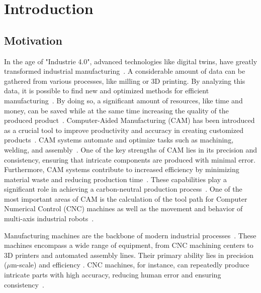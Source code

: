 \chapter{Introduction}%
\section{Motivation}%

In the age of "Industrie 4.0", advanced technologies like digital twins, have greatly transformed industrial manufacturing~\cite{Singh.2021}. A considerable amount of data can be gathered from various processes, like milling or 3D printing. By analyzing this data, it is possible to find new and optimized methods for efficient manufacturing~\cite{Ghobakhloo.2020}. By doing so, a significant amount of resources, like time and money, can be saved while at the same time increasing the quality of the produced product~\cite{Bibby.2018,Simonis.2016}.\newline
Computer-Aided Manufacturing (CAM) has been introduced as a crucial tool to improve productivity and accuracy in creating customized products~\cite{Feldhausen.2022}. CAM systems automate and optimize tasks such as machining, welding, and assembly~\cite{LalitNarayan.2013b}. One of the key strengths of CAM lies in its precision and consistency, ensuring that intricate components are produced with minimal error. Furthermore, CAM systems contribute to increased efficiency by minimizing material waste and reducing production time~\cite{Dubovska.2014}. These capabilities play a significant role in achieving a carbon-neutral production process~\cite{Saxena.2020}. One of the most important areas of CAM is the calculation of the tool path for Computer Numerical Control (CNC) machines as well as the movement and behavior of multi-axis industrial robots~\cite{Pan}. \newline


Manufacturing machines are the backbone of modern industrial processes~\cite{Bi.2020}. These machines encompass a wide range of equipment, from CNC machining centers to 3D printers and automated assembly lines. Their primary ability lies in precision ($\mu$m-scale) and efficiency \cite{Liberman.2021}. CNC machines, for instance, can repeatedly produce intricate parts with high accuracy, reducing human error and ensuring consistency~\cite{Jia.2018}. 

